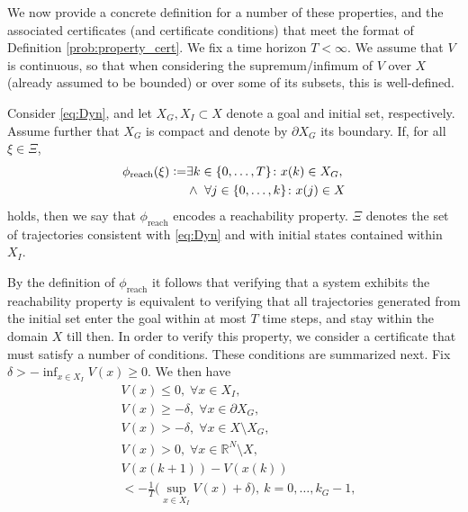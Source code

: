 We now provide a concrete definition for a number of these properties, and the associated certificates (and certificate conditions) that meet the format of Definition \ref{prob:property_cert}. We fix a time horizon $T<\infty$. We assume that $V$ is continuous, so that when considering the supremum/infimum of $V$ over $X$ (already assumed to be bounded) or over some of its subsets, this is well-defined.

\begin{property}[Reachability]\label{prop:reach}
Consider \eqref{eq:Dyn}, and let
    $X_G, X_I \subset X$ denote a goal and initial set, respectively. Assume further that $X_G$ is compact and denote by $\partial X_G$ its boundary. If, for all $\xi \in \Xi$, 
    \begin{align}
        \phi_{\mathrm{reach}}(\xi) \vcentcolon= &\exists k \in \{0,\dots,T\} \colon x(k) \in X_G, \nonumber \\
        &\wedge~ \forall j \in \{0,\dots,k\} \colon x(j) \in X
    \end{align}
    holds, then we say that $\phi_{\mathrm{reach}}$ encodes a reachability property.
    $\Xi$ denotes the set of trajectories consistent with \eqref{eq:Dyn} and with initial states contained within $X_I$.
\end{property}
By the definition of $\phi_{\mathrm{reach}}$ it follows that verifying that a system exhibits the reachability property is equivalent to verifying that all trajectories generated from the initial set enter the goal within at most $T$ time steps, and stay within the domain $X$ till then.
In order to verify this property, we consider a certificate that must satisfy a number of conditions. 
These conditions are summarized next. Fix $\delta> -\inf_{x \in X_I} V(x) \geq 0$.  We then have
\begin{align}
	\label{eq:reach_init}	
  &V(x) \leq 0, \; \forall x \in X_I,\\
 \label{eq:reach_goal}
		&V(x) \geq -\delta, \; \forall x \in \partial X_G, \\
  \label{eq:reach_else}
		&V(x) > -\delta, \; \forall x \in X \setminus X_G,\\
        &V(x) > 0, \; \forall x \in \mathbb{R}^N \setminus X,
  \label{eq:reach_dom_border}\\
		&V(x(k+1)) - V(x(k)) \label{eq:reach_deriv} \\ 
        & <- \frac{1}{T} \Big( \sup_{x \in X_I} V(x) + \delta \Big),~ k=0,\dots,k_G-1, \nonumber %
\end{align}
